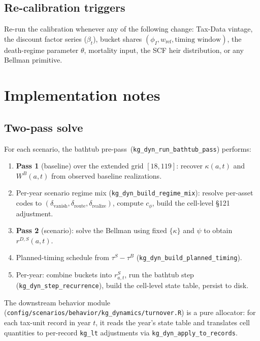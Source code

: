 \documentclass[11pt]{article}
\newcommand{\tauB}{\tau^{B}}
\newcommand{\tauS}{\tau^{S}}
\newcommand{\rS}{r^{S}}
\begin{document}
\subsection{Re-calibration triggers}

Re-run the calibration whenever any of the following change: Tax-Data
vintage, the discount factor series ($\beta_t$), bucket shares
$(\phi_I, w_{\text{ref}}, \text{timing window})$, the death-regime parameter
$\theta$, mortality input, the SCF heir distribution, or any Bellman
primitive.

\section{Implementation notes}
\label{app:impl}

\subsection{Two-pass solve}

For each scenario, the bathtub pre-pass~(\texttt{kg\_dyn\_run\_bathtub\_pass})
performs:
\begin{enumerate}
  \item \textbf{Pass 1} (baseline) over the extended grid $[18, 119]$:
        recover $\kappa(a, t)$ and $W^B(a, t)$ from observed baseline
        realizations.
  \item Per-year scenario regime mix
        (\texttt{kg\_dyn\_build\_regime\_mix}): resolve per-asset codes to
        $(\delta_{\text{vanish}}, \delta_{\text{route}}, \delta_{\text{realize}})$,
        compute $c_\phi$, build the cell-level \S{121} adjustment.
  \item \textbf{Pass 2} (scenario): solve the Bellman using fixed
        $\{\kappa\}$ and $\psi$ to obtain $r^{D,S}(a, t)$.
  \item Planned-timing schedule from
        $\tauS - \tauB$ (\texttt{kg\_dyn\_build\_planned\_timing}).
  \item Per-year: combine buckets into $\rS_{a,t}$, run the bathtub step
        (\texttt{kg\_dyn\_step\_recurrence}), build the cell-level state
        table, persist to disk.
\end{enumerate}
The downstream behavior module
(\texttt{config/scenarios/behavior/kg\_dynamics/turnover.R}) is a pure
allocator: for each tax-unit record in year $t$, it reads the year's
state table and translates cell quantities to per-record \texttt{kg\_lt}
adjustments via \texttt{kg\_dyn\_apply\_to\_records}.
\end{document}
